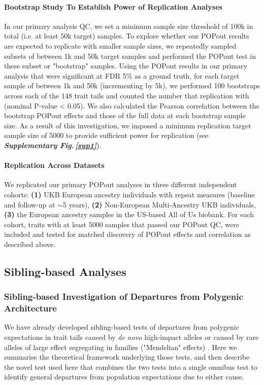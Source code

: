 \documentclass[12pt]{zHenriquesLab-StyleBioRxiv}
\newcommand\sref[1]{\normalsize{\textbf{\textit{Supplementary Fig.\,\ref{#1}}}}\normalsize{}}
\begin{document}
\paragraph{Bootstrap Study To Establish Power of Replication Analyses}
In our primary analysis QC, we set a minimum sample size threshold of 100k in total 
(i.e. at least 50k target) samples. To explore whether our POPout results are expected 
to replicate with smaller sample sizes, we repeatedly sampled subsets of between 1k and 50k 
target samples and performed the POPout test in these subset or "bootstrap" samples. 
Using the POPout results in our primary analysis that were significant at FDR 5\% as a ground 
truth, for each target sample of between 1k and 50k (incrementing by 5k), 
we performed 100 bootstraps across each of the 148 trait tails and counted 
the number that replication with (nominal P-value < 0.05). 
We also calculated the Pearson correlation between the bootstrap 
POPout effects and those of the full data at each bootstrap sample size. As a result of 
this investigation, we imposed a minimum replication target sample size of 5000 to 
provide sufficient power for replication (see \sref{sup1}). 


\paragraph{Replication Across Datasets} 
We replicated our primary POPout analyses in three different independent cohorts:  
\textbf{(1)} UKB European ancestry individuals with repeat measures (baseline and follow-up at $\sim$5 years), 
\textbf{(2)} Non-European Multi-Ancestry UKB individuals, \textbf{(3)} the European ancestry samples in the 
US-based All of Us biobank. For each cohort, traits with at least 5000 samples that passed our POPout QC, 
were included and tested for matched discovery of POPout effects and correlation as described above. 
%
\subsection*{Sibling-based Analyses} \label{sec:methods:sibs}  
%
\subsubsection*{Sibling-based Investigation of Departures from Polygenic Architecture}
We have already developed sibling-based tests of departures from polygenic expectations 
in trait tails caused by \emph{de novo} high-impact alleles or caused by rare alleles of 
large effect segregating in families ("Mendelian" effects) \cite{Souaiaia2024}. Here we 
summarise the theoretical framework underlying those tests, and then describe the novel 
test used here that combines the two tests into a single omnibus test to identify general 
departures from population expectations due to either cause.
\end{document}
